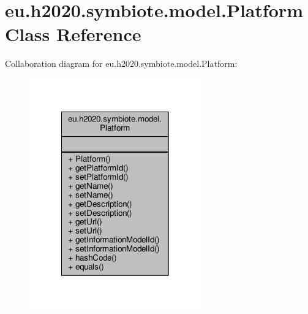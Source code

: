 \hypertarget{classeu_1_1h2020_1_1symbiote_1_1model_1_1Platform}{}\section{eu.\+h2020.\+symbiote.\+model.\+Platform Class Reference}
\label{classeu_1_1h2020_1_1symbiote_1_1model_1_1Platform}


Collaboration diagram for eu.\+h2020.\+symbiote.\+model.\+Platform\+:
\nopagebreak
\begin{figure}[H]
\begin{center}
\leavevmode
\includegraphics[width=210pt]{classeu_1_1h2020_1_1symbiote_1_1model_1_1Platform__coll__graph}
\end{center}
\end{figure}
